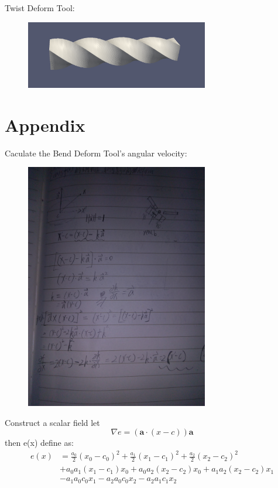 \documentclass{article}
\theoremstyle{definition}
\theoremstyle{remark}
\begin{document}
Twist Deform Tool:
\begin{figure}[H]
\includegraphics[width=8cm]{twist_result}
\centering
\end{figure}

\section{Appendix}
Caculate the Bend Deform Tool's angular velocity:
\begin{figure}[H]
\includegraphics[width=8cm]{angular_velocity}
\centering
\end{figure}
Construct a scalar field let
\begin{equation}
  \nabla e = (\textbf{a} \cdot (x-c)) \textbf{a}
\end{equation}
then e(x) define as:
\begin{equation}
  \begin{aligned}
  e(x) &= \frac{a_0}{2}(x_0-c_0)^2 + \frac{a_1}{2}(x_1-c_1)^2 + \frac{a_2}{2}(x_2-c_2)^2 \\
  &+ a_0a_1(x_1-c_1)x_0 + a_0a_2(x_2-c_2)x_0+ a_1a_2(x_2-c_2)x_1\\
  &-a_1a_0c_0x_1-a_2a_0c_0x_2 - a_2a_1c_1x_2
  \end{aligned}
\end{equation}
\end{document}
